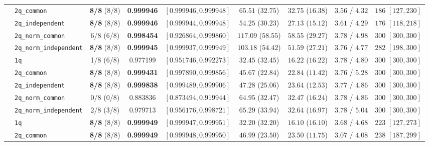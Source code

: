 \documentclass[10pt,a4paper]{article}
\begin{document}
\begin{table}[h!]
{\begin{tabular}{llccccccc}
  & \texttt{2q\_common} & \textbf{8/8} (8/8) & \textbf{0.999946} & $[0.999946, 0.999948]$ & $65.51$ ($32.75$) & $32.75$ ($16.38$) & $3.56$ / $4.32$ & $186$ $[127, 230]$ \\
  & \texttt{2q\_independent} & \textbf{8/8} (8/8) & \textbf{0.999946} & $[0.999944, 0.999948]$ & $54.25$ ($30.23$) & $27.13$ ($15.12$) & $3.61$ / $4.29$ & $176$ $[118, 218]$ \\
  & \texttt{2q\_norm\_common} & 6/8 (6/8) & \textbf{0.998454} & $[0.926864, 0.999860]$ & $117.09$ ($58.55$) & $58.55$ ($29.27$) & $3.78$ / $4.98$ & $300$ $[300, 300]$ \\
  & \texttt{2q\_norm\_independent} & \textbf{8/8} (8/8) & \textbf{0.999945} & $[0.999937, 0.999949]$ & $103.18$ ($54.42$) & $51.59$ ($27.21$) & $3.76$ / $4.77$ & $282$ $[198, 300]$ \\
\midrule
  & \texttt{1q} & 1/8 (6/8) & 0.977199 & $[0.951746, 0.992273]$ & $32.45$ ($32.45$) & $16.22$ ($16.22$) & $3.78$ / $4.80$ & $300$ $[300, 300]$ \\
  & \texttt{2q\_common} & \textbf{8/8} (8/8) & \textbf{0.999431} & $[0.997890, 0.999856]$ & $45.67$ ($22.84$) & $22.84$ ($11.42$) & $3.76$ / $5.28$ & $300$ $[300, 300]$ \\
  & \texttt{2q\_independent} & \textbf{8/8} (8/8) & \textbf{0.999838} & $[0.999489, 0.999906]$ & $47.28$ ($25.06$) & $23.64$ ($12.53$) & $3.77$ / $4.86$ & $300$ $[300, 300]$ \\
  & \texttt{2q\_norm\_common} & 0/8 (0/8) & 0.883836 & $[0.873494, 0.919944]$ & $64.95$ ($32.47$) & $32.47$ ($16.24$) & $3.78$ / $4.86$ & $300$ $[300, 300]$ \\
  & \texttt{2q\_norm\_independent} & 2/8 (3/8) & 0.979713 & $[0.956176, 0.998721]$ & $65.29$ ($33.94$) & $32.64$ ($16.97$) & $3.78$ / $5.04$ & $300$ $[300, 300]$ \\
\midrule
  & \texttt{1q} & \textbf{8/8} (8/8) & \textbf{0.999949} & $[0.999947, 0.999951]$ & $32.20$ ($32.20$) & $16.10$ ($16.10$) & $3.68$ / $4.68$ & $223$ $[127, 273]$ \\
  & \texttt{2q\_common} & \textbf{8/8} (8/8) & \textbf{0.999949} & $[0.999948, 0.999950]$ & $46.99$ ($23.50$) & $23.50$ ($11.75$) & $3.07$ / $4.08$ & $238$ $[187, 299]$ \\

\end{tabular}}
\end{table}
\end{document}
